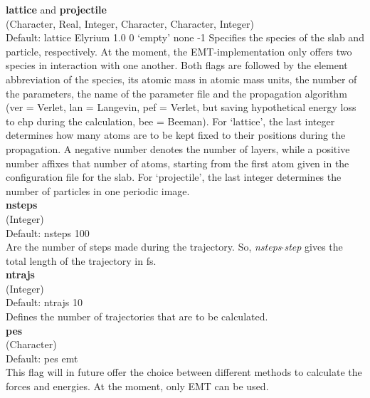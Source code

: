 \documentclass[twoside, 11pt, titlepage, captions=nooneline, a4paper, headsepline]{scrbook}%
\begin{document}
\noindent\textbf{lattice} and \textbf{projectile}\\ 
(Character, Real, Integer, Character, Character, Integer)\\ 
Default: lattice Elyrium 1.0 0 `empty' none -1
Specifies the species of the slab and particle, respectively. At the moment, the EMT-implementation only offers two species in interaction with one another. Both flags are followed by the element abbreviation of the species, its atomic mass in atomic mass units, the number of the parameters, the name of the parameter file and the propagation algorithm (ver = Verlet, lan = Langevin, pef = Verlet, but saving hypothetical energy loss to ehp during the calculation, bee = Beeman). For `lattice', the last integer determines how many atoms are to be kept fixed to their positions during the propagation. A negative number denotes the number of layers, while a positive number affixes that number of atoms, starting from the first atom given in the configuration file for the slab. For `projectile', the last integer determines the number of particles in one periodic image.\\

\noindent\textbf{nsteps}\\(Integer)\\
Default: nsteps 100\\
Are the number of steps made during the trajectory. So, \textit{nsteps}$\cdot$\textit{step} gives the total length of the trajectory in fs.\\

\noindent\textbf{ntrajs}\\
(Integer)\\
Default: ntrajs 10\\
Defines the number of trajectories that are to be calculated.\\

\noindent\textbf{pes}\\
(Character)\\
Default: pes emt\\
This flag will in future offer the choice between different methods to calculate the forces and energies. At the moment, only EMT can be used.\\
\end{document}
